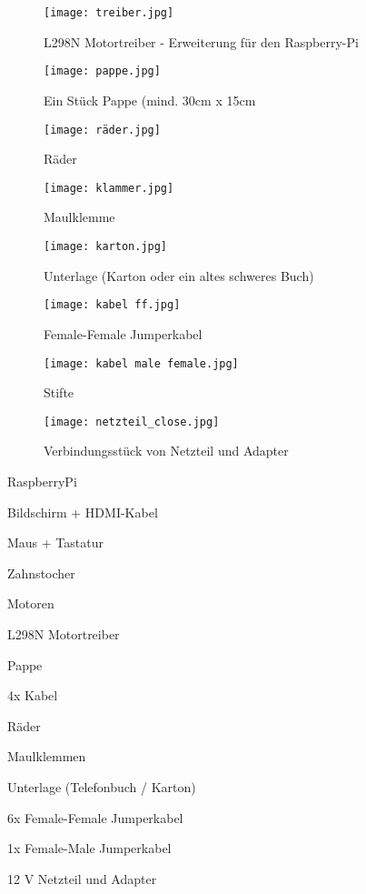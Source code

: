 \begin{figure}[h]
\centering
\parbox{5cm}{
\texttt{[image: treiber.jpg]}
\caption*{L298N Motortreiber - Erweiterung für den Raspberry-Pi}
}
\qquad
\begin{minipage}{5cm}
\texttt{[image: pappe.jpg]}
\caption*{Ein Stück Pappe (mind. 30cm x 15cm}
\end{minipage}
\end{figure}

\begin{figure}[h]
\centering
\parbox{5cm}{
\texttt{[image: räder.jpg]}
\caption*{Räder}
}
\qquad
\begin{minipage}{5cm}
\texttt{[image: klammer.jpg]}
\caption*{Maulklemme}
\end{minipage}
\end{figure}

\begin{figure}[h]
\centering
\parbox{5cm}{
\texttt{[image: karton.jpg]}
\caption*{Unterlage (Karton oder ein altes schweres Buch)}
}
\qquad
\begin{minipage}{5cm}
\texttt{[image: kabel ff.jpg]}
\caption*{Female-Female Jumperkabel}
\end{minipage}
\end{figure}

\begin{figure}[h]
\centering
\parbox{5cm}{
\texttt{[image: kabel male female.jpg]}
\caption*{Stifte}
}
\qquad
\begin{minipage}{5cm}
\texttt{[image: netzteil\_close.jpg]}
\caption*{Verbindungsstück von Netzteil und Adapter}
\end{minipage}
\end{figure}


\begin{checklist}
    \item RaspberryPi
    \item Bildschirm + HDMI-Kabel
    \item Maus + Tastatur
    \item Zahnstocher
    \item Motoren
    \item L298N Motortreiber
    \item Pappe
    \item 4x Kabel
    \item Räder
    \item Maulklemmen
    \item Unterlage (Telefonbuch / Karton)
    \item 6x Female-Female Jumperkabel
    \item 1x Female-Male Jumperkabel
    \item 12 V Netzteil und Adapter
\end{checklist}


